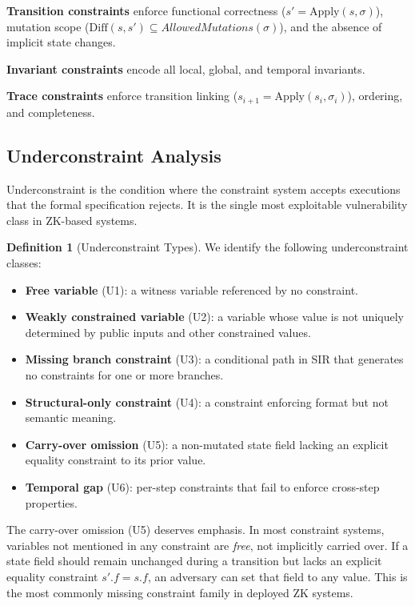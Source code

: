 \documentclass[11pt,a4paper]{article}
\theoremstyle{definition}
\newtheorem{definition}{Definition}[section]
\newcommand{\Apply}{\mathrm{Apply}}
\begin{document}
\noindent\textbf{Transition constraints} enforce functional correctness ($s' = \Apply(s, \sigma)$), mutation scope ($\mathrm{Diff}(s, s') \subseteq \mathit{AllowedMutations}(\sigma)$), and the absence of implicit state changes.

\noindent\textbf{Invariant constraints} encode all local, global, and temporal invariants.

\noindent\textbf{Trace constraints} enforce transition linking ($s_{i+1} = \Apply(s_i, \sigma_i)$), ordering, and completeness.

\subsection{Underconstraint Analysis}
\label{subsec:underconstraint}

Underconstraint is the condition where the constraint system accepts executions that the formal specification rejects. It is the single most exploitable vulnerability class in ZK-based systems.

\begin{definition}[Underconstraint Types]
\label{def:underconstraint-types}
We identify the following underconstraint classes:
\begin{itemize}[nosep]
\item \textbf{Free variable} (U1): a witness variable referenced by no constraint.
\item \textbf{Weakly constrained variable} (U2): a variable whose value is not uniquely determined by public inputs and other constrained values.
\item \textbf{Missing branch constraint} (U3): a conditional path in SIR that generates no constraints for one or more branches.
\item \textbf{Structural-only constraint} (U4): a constraint enforcing format but not semantic meaning.
\item \textbf{Carry-over omission} (U5): a non-mutated state field lacking an explicit equality constraint to its prior value.
\item \textbf{Temporal gap} (U6): per-step constraints that fail to enforce cross-step properties.
\end{itemize}
\end{definition}

The carry-over omission (U5) deserves emphasis. In most constraint systems, variables not mentioned in any constraint are \emph{free}, not implicitly carried over. If a state field should remain unchanged during a transition but lacks an explicit equality constraint $s'.f = s.f$, an adversary can set that field to any value. This is the most commonly missing constraint family in deployed ZK systems.
\end{document}
